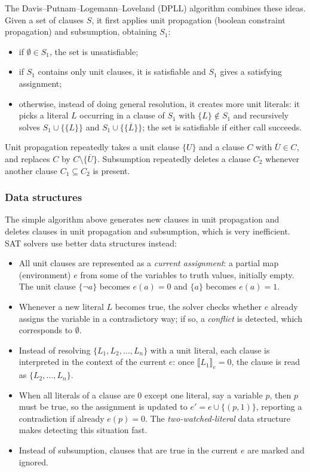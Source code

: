 The Davis--Putnam--Logemann--Loveland (DPLL) algorithm combines these ideas. Given a set of clauses $S$, it first applies unit propagation (boolean constraint propagation) and subsumption, obtaining $S_1$:
\begin{itemize}
  \item if $\emptyset \in S_1$, the set is unsatisfiable;
  \item if $S_1$ contains only unit clauses, it is satisfiable and $S_1$ gives a satisfying assignment;
  \item otherwise, instead of doing general resolution, it creates more unit literals: it picks a literal $L$ occurring in a clause of $S_1$ with $\{L\} \notin S_1$ and recursively solves $S_1 \cup \{\{L\}\}$ and $S_1 \cup \{\{\overline{L}\}\}$; the set is satisfiable if either call succeeds.
\end{itemize}
Unit propagation repeatedly takes a unit clause $\{U\}$ and a clause $C$ with $\overline{U} \in C$, and replaces $C$ by $C \setminus \{\overline{U}\}$. Subsumption repeatedly deletes a clause $C_2$ whenever another clause $C_1 \subseteq C_2$ is present.
 
\subsubsection*{Data structures}
 
The simple algorithm above generates new clauses in unit propagation and deletes clauses in unit propagation and subsumption, which is very inefficient. SAT solvers use better data structures instead:
\begin{itemize}
  \item All unit clauses are represented as a \emph{current assignment}: a partial map (environment) $e$ from some of the variables to truth values, initially empty. The unit clause $\{\neg a\}$ becomes $e(a) = 0$ and $\{a\}$ becomes $e(a) = 1$.
  \item Whenever a new literal $L$ becomes true, the solver checks whether $e$ already assigns the variable in a contradictory way; if so, a \emph{conflict} is detected, which corresponds to $\emptyset$.
  \item Instead of resolving $\{L_1, L_2, \ldots, L_n\}$ with a unit literal, each clause is interpreted in the context of the current $e$: once $\llbracket L_1 \rrbracket_e = 0$, the clause is read as $\{L_2, \ldots, L_n\}$.
  \item When all literals of a clause are $0$ except one literal, say a variable $p$, then $p$ must be true, so the assignment is updated to $e' = e \cup \{(p, 1)\}$, reporting a contradiction if already $e(p) = 0$. The \emph{two-watched-literal} data structure makes detecting this situation fast.
  \item Instead of subsumption, clauses that are true in the current $e$ are marked and ignored.
\end{itemize}
 
